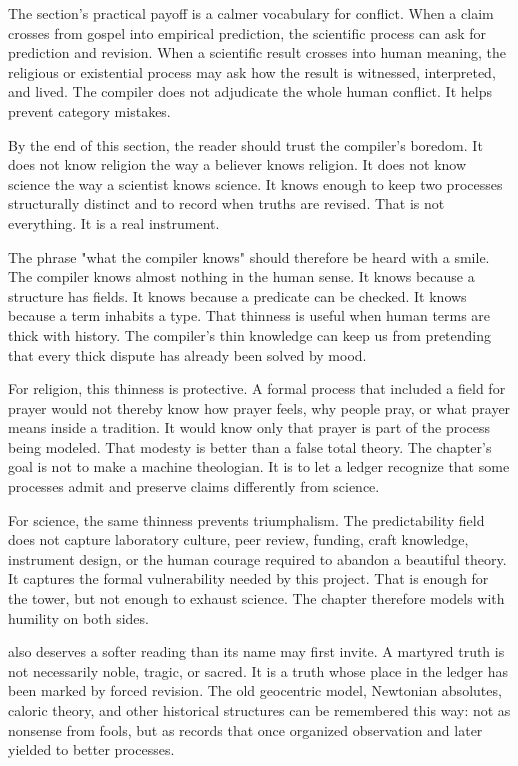 The section's practical payoff is a calmer vocabulary for conflict. When a
claim crosses from gospel into empirical prediction, the scientific process can
ask for prediction and revision. When a scientific result crosses into human
meaning, the religious or existential process may ask how the result is
witnessed, interpreted, and lived. The compiler does not adjudicate the whole
human conflict. It helps prevent category mistakes.

By the end of this section, the reader should trust the compiler's boredom. It
does not know religion the way a believer knows religion. It does not know
science the way a scientist knows science. It knows enough to keep two
processes structurally distinct and to record when truths are revised. That is
not everything. It is a real instrument.

The phrase "what the compiler knows" should therefore be heard with a smile.
The compiler knows almost nothing in the human sense. It knows because a
structure has fields. It knows because a predicate can be checked. It knows
because a term inhabits a type. That thinness is useful when human terms are
thick with history. The compiler's thin knowledge can keep us from pretending
that every thick dispute has already been solved by mood.

For religion, this thinness is protective. A formal process that included a
field for prayer would not thereby know how prayer feels, why people pray, or
what prayer means inside a tradition. It would know only that prayer is part of
the process being modeled. That modesty is better than a false total theory.
The chapter's goal is not to make a machine theologian. It is to let a ledger
recognize that some processes admit and preserve claims differently from
science.

For science, the same thinness prevents triumphalism. The predictability field
does not capture laboratory culture, peer review, funding, craft knowledge,
instrument design, or the human courage required to abandon a beautiful theory.
It captures the formal vulnerability needed by this project. That is enough for
the tower, but not enough to exhaust science. The chapter therefore models with
humility on both sides.

 also deserves a softer reading than its name may first invite.
A martyred truth is not necessarily noble, tragic, or sacred. It is a truth
whose place in the ledger has been marked by forced revision. The old
geocentric model, Newtonian absolutes, caloric theory, and other historical
structures can be remembered this way: not as nonsense from fools, but as
records that once organized observation and later yielded to better processes.

